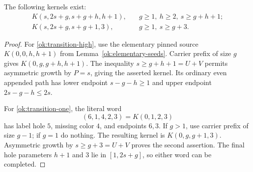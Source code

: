 \begin{lemma}\label{ok:transition-kernels}
The following kernels exist:
\begin{align}
 K(s,2s+g,s+g+h,h+1),
 &\quad g\ge1,\ h\ge2,\ s\ge g+h+1; \label{ok:transition-high}\\
 K(s,2s+g,s+g+1,3),
 &\quad g\ge1,\ s\ge g+3. \label{ok:transition-one}
\end{align}
\end{lemma}
\begin{proof}
For \eqref{ok:transition-high}, use the elementary pinned source
$K(0,0,h,h+1)$ from Lemma~\ref{ok:elementary-seeds}.
Carrier prefix of size $g$ gives $K(0,g,g+h,h+1)$.
The inequality $s\ge g+h+1=U+V$ permits asymmetric growth
by $P=s$, giving the asserted kernel. Its ordinary even appended
path has lower endpoint $s-g-h\ge1$ and upper endpoint
$2s-g-h\le2s$.

For \eqref{ok:transition-one}, the literal word
\[
 (6,1,4,2,3)=K(0,1,2,3)
 \]
has label hole $5$, missing color $4$, and endpoints $6,3$.
If $g>1$, use carrier prefix of size $g-1$; if $g=1$ do
nothing. The resulting kernel is $K(0,g,g+1,3)$.
Asymmetric growth by $s\ge g+3=U+V$ proves the second assertion.
The final hole parameters $h+1$ and $3$ lie in $[1,2s+g]$,
so either word can be completed.
\end{proof}

